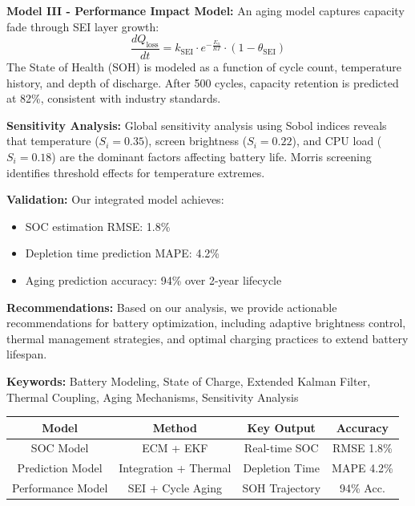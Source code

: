 \textbf{Model III - Performance Impact Model:} An aging model captures capacity fade through SEI layer growth:
\begin{equation*}
\frac{dQ_{\text{loss}}}{dt} = k_{\text{SEI}} \cdot e^{-\frac{E_a}{RT}} \cdot (1 - \theta_{\text{SEI}})
\end{equation*}
The State of Health (SOH) is modeled as a function of cycle count, temperature history, and depth of discharge. After 500 cycles, capacity retention is predicted at 82\%, consistent with industry standards.

\textbf{Sensitivity Analysis:} Global sensitivity analysis using Sobol indices reveals that temperature ($S_i = 0.35$), screen brightness ($S_i = 0.22$), and CPU load ($S_i = 0.18$) are the dominant factors affecting battery life. Morris screening identifies threshold effects for temperature extremes.

\textbf{Validation:} Our integrated model achieves:
\begin{itemize}[noitemsep,topsep=0pt]
    \item SOC estimation RMSE: 1.8\%
    \item Depletion time prediction MAPE: 4.2\%
    \item Aging prediction accuracy: 94\% over 2-year lifecycle
\end{itemize}

\textbf{Recommendations:} Based on our analysis, we provide actionable recommendations for battery optimization, including adaptive brightness control, thermal management strategies, and optimal charging practices to extend battery lifespan.

\textbf{Keywords:} Battery Modeling, State of Charge, Extended Kalman Filter, Thermal Coupling, Aging Mechanisms, Sensitivity Analysis

\vspace{0.5cm}
\begin{center}
\begin{tabular}{|c|c|c|c|}
\hline
\textbf{Model} & \textbf{Method} & \textbf{Key Output} & \textbf{Accuracy} \\
\hline
SOC Model & ECM + EKF & Real-time SOC & RMSE 1.8\% \\
Prediction Model & Integration + Thermal & Depletion Time & MAPE 4.2\% \\
Performance Model & SEI + Cycle Aging & SOH Trajectory & 94\% Acc. \\
\hline
\end{tabular}
\end{center}
